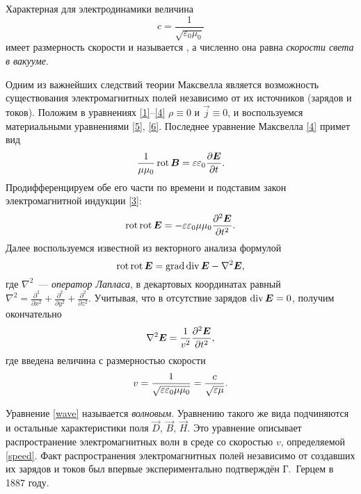 Характерная для электродинамики величина
\[
c=\frac{1}{\sqrt{\varepsilon_0\mu_0}}
\]
имеет размерность скорости и называется , 
а численно она равна \emph{скорости света в вакууме}.

\label{sec:emwaves}

Одним из важнейших следствий теории Максвелла является возможность существования
электромагнитных полей независимо от их источников (зарядов и токов).
Положим в уравнениях \eqref{1}--\eqref{4} $\rho\equiv 0$ и $\vec{j}\equiv 0$,
и воспользуемся материальными уравнениями \eqref{5}, \eqref{6}.
Последнее уравнение Максвелла \eqref{4} примет вид
\[
\frac{1}{\mu \mu_0} \mathop{\mathrm{rot}} {\boldsymbol{B}} =  \varepsilon \varepsilon_0 \frac{\partial {\boldsymbol{E}}}{\partial t}.
\]
Продифференцируем обе его части по времени и подставим закон электромагнитной индукции \eqref{3}:
\[
\mathop{\mathrm{rot}}\mathop{\mathrm{rot}} {\boldsymbol{E}} = -\varepsilon\varepsilon_0 \mu\mu_0 \frac{\partial^2 {\boldsymbol{E}}}{\partial t^2}.
\]
Далее воспользуемся известной из векторного анализа формулой
\begin{equation} \eqmark{rotrot}
\Rot\Rot\vec{E}=\Grad\Div\vec{E}-\nabla^2\vec{E},
\end{equation}
где $\nabla^2$~--- \emph{оператор Лапласа}, в декартовых координатах равный
$\nabla^2 = \frac{\partial^2}{\partial x^2} + 
\frac{\partial^2}{\partial y^2}+
\frac{\partial^2}{\partial z^2}$.
Учитывая, что в отсутствие зарядов $\mathop{\mathrm{div}}{\boldsymbol{E}}=0$, получим окончательно
\begin{equation} \eqmark{wave}
\nabla^2\vec{E}=\frac{1}{v^2} \frac{\partial^2 \vec{E}}{\partial t^2},
\end{equation}
где введена величина с размерностью скорости
\begin{equation}\eqmark{speed}
v = \frac{1}{\sqrt{\varepsilon\varepsilon_0 \mu \mu_0}}= \frac{c}{\sqrt{\varepsilon\mu}}.
\end{equation}

Уравнение \eqref{wave} называется \emph{волновым}. Уравнению такого же вида 
подчиняются и остальные характеристики поля $\vec{D}$, $\vec{B}$, $\vec{H}$. 
Это уравнение описывает распространение электромагнитных волн в среде со скоростью $v$,
определяемой \eqref{speed}. Факт распространения электромагнитных полей независимо
от создавших их зарядов и токов был впервые экспериментально подтверждён
Г.~Герцем в 1887 году.


